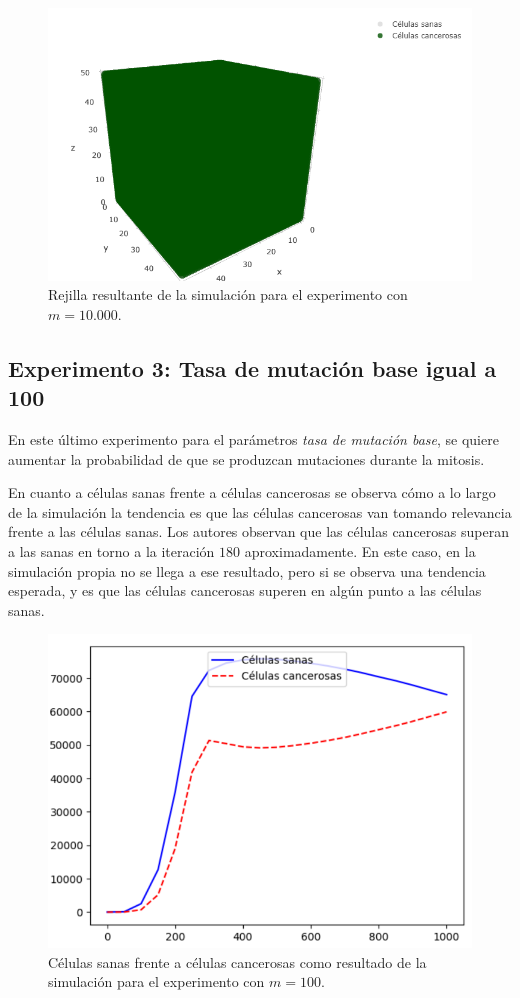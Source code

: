 \begin{figure}[h]
\centering
\includegraphics[scale=0.6]{figures/experiments/exp2/grid}
\caption{Rejilla resultante de la simulación para el experimento con $m = 10.000$.}
\end{figure}

\subsection{Experimento 3: Tasa de mutación base igual a 100}

En este último experimento para el parámetros \textit{tasa de mutación base}, se
quiere aumentar la probabilidad de que se produzcan mutaciones durante la mitosis.

En cuanto a células sanas frente a células cancerosas se observa cómo a lo largo de la simulación la
tendencia es que las células cancerosas van tomando relevancia frente a las células sanas. Los autores
observan que las células cancerosas superan a las sanas en torno a la iteración $180$ aproximadamente.
En este caso, en la simulación propia no se llega a ese resultado, pero si se observa una tendencia esperada,
y es que las células cancerosas superen en algún punto a las células sanas.

\begin{figure}[h]
\centering
\includegraphics[scale=0.8]{figures/experiments/exp3/healthvscarcino}
\caption{Células sanas frente a células cancerosas como resultado de la simulación para el experimento con $m = 100$.}
\end{figure}

